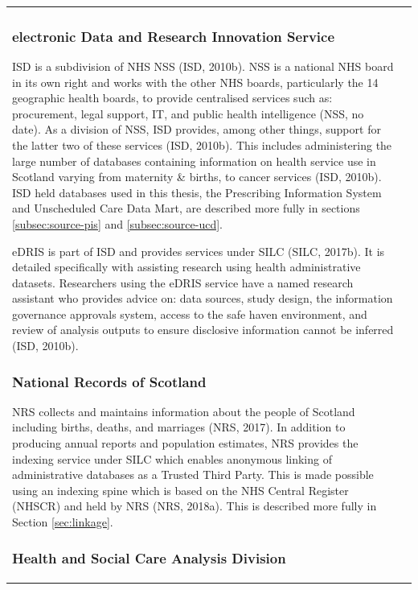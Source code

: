 \documentclass[12pt,a4paper,oneside,table]{report}
\begin{document}
\begin{tabular}[t]{ll}
\subsubsection{electronic Data and Research Innovation Service}\label{subsec:edris}

ISD is a subdivision of NHS NSS (ISD, 2010b). NSS is a national NHS
board in its own right and works with the other NHS boards, particularly
the 14 geographic health boards, to provide centralised services such
as: procurement, legal support, IT, and public health intelligence (NSS,
no date). As a division of NSS, ISD provides, among other things,
support for the latter two of these services (ISD, 2010b). This includes
administering the large number of databases containing information on
health service use in Scotland varying from maternity \& births, to
cancer services (ISD, 2010b). ISD held databases used in this thesis,
the Prescribing Information System and Unscheduled Care Data Mart, are
described more fully in sections \ref{subsec:source-pis} and
\ref{subsec:source-ucd}.

eDRIS is part of ISD and provides services under SILC (SILC, 2017b). It
is detailed specifically with assisting research using health
administrative datasets. Researchers using the eDRIS service have a
named research assistant who provides advice on: data sources, study
design, the information governance approvals system, access to the safe
haven environment, and review of analysis outputs to ensure disclosive
information cannot be inferred (ISD, 2010b).

\subsubsection{National Records of Scotland}\label{subsec:nrs}

NRS collects and maintains information about the people of Scotland
including births, deaths, and marriages (NRS, 2017). In addition to
producing annual reports and population estimates, NRS provides the
indexing service under SILC which enables anonymous linking of
administrative databases as a Trusted Third Party. This is made possible
using an indexing spine which is based on the NHS Central Register
(NHSCR) and held by NRS (NRS, 2018a). This is described more fully in
Section \ref{sec:linkage}.

\subsubsection{Health and Social Care Analysis Division}\label{subsec:asd}


\end{tabular}
\end{document}
